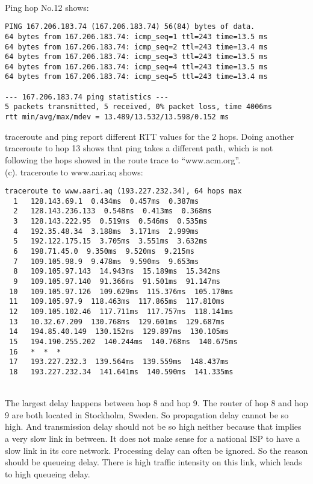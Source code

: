 \documentclass[titlepage, paper=a4, fontsize=11pt]{scrartcl} %
\numberwithin{equation}{section} %
\numberwithin{figure}{section} %
\numberwithin{table}{section} %
\begin{document}
~\\
Ping hop No.12 shows:
\begin{lstlisting}
PING 167.206.183.74 (167.206.183.74) 56(84) bytes of data.
64 bytes from 167.206.183.74: icmp_seq=1 ttl=243 time=13.5 ms
64 bytes from 167.206.183.74: icmp_seq=2 ttl=243 time=13.4 ms
64 bytes from 167.206.183.74: icmp_seq=3 ttl=243 time=13.5 ms
64 bytes from 167.206.183.74: icmp_seq=4 ttl=243 time=13.5 ms
64 bytes from 167.206.183.74: icmp_seq=5 ttl=243 time=13.4 ms

--- 167.206.183.74 ping statistics ---
5 packets transmitted, 5 received, 0% packet loss, time 4006ms
rtt min/avg/max/mdev = 13.489/13.532/13.598/0.152 ms
\end{lstlisting}
traceroute and ping report different RTT values for the 2 hops. Doing another traceroute to hop 13 shows that ping takes a different path, which is not following the hops showed in the route trace to ``www.acm.org''.
~\\[18pt]
(c). traceroute to www.aari.aq shows:
\begin{lstlisting}
traceroute to www.aari.aq (193.227.232.34), 64 hops max
  1   128.143.69.1  0.434ms  0.457ms  0.387ms 
  2   128.143.236.133  0.548ms  0.413ms  0.368ms 
  3   128.143.222.95  0.519ms  0.546ms  0.535ms 
  4   192.35.48.34  3.188ms  3.171ms  2.999ms 
  5   192.122.175.15  3.705ms  3.551ms  3.632ms 
  6   198.71.45.0  9.350ms  9.520ms  9.215ms 
  7   109.105.98.9  9.478ms  9.590ms  9.653ms 
  8   109.105.97.143  14.943ms  15.189ms  15.342ms 
  9   109.105.97.140  91.366ms  91.501ms  91.147ms 
 10   109.105.97.126  109.629ms  115.376ms  105.170ms 
 11   109.105.97.9  118.463ms  117.865ms  117.810ms 
 12   109.105.102.46  117.711ms  117.757ms  118.141ms 
 13   10.32.67.209  130.768ms  129.601ms  129.687ms 
 14   194.85.40.149  130.152ms  129.897ms  130.105ms 
 15   194.190.255.202  140.244ms  140.768ms  140.675ms 
 16   *  *  * 
 17   193.227.232.3  139.564ms  139.559ms  148.437ms 
 18   193.227.232.34  141.641ms  140.590ms  141.335ms
 \end{lstlisting}
 ~\\
 The largest delay happens between hop 8 and hop 9. The router of hop 8 and hop 9 are both located in Stockholm, Sweden. So propagation delay cannot be so high. And transmission delay should not be so high neither because that implies a very slow link in between. It does not make sense for a national ISP to have a slow link in its core network. Processing delay can often be ignored. So the reason should be queueing delay. There is high traffic intensity on this link, which leads to high queueing delay.
\end{document}
